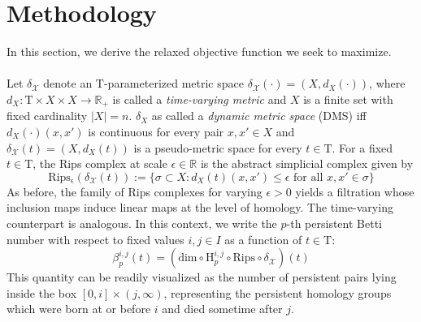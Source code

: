\documentclass[10pt]{article}
\begin{document}
\section{Methodology}
In this section, we derive the relaxed objective function we seek to maximize. 
\\
\\
Let $\delta_\mathcal{X}$ denote an $\mathrm{T}$-parameterized metric space $\delta_\mathcal{X}(\cdot) = ( X, d_X(\cdot) )$, where $d_X: \mathrm{T} \times X \times X \to \mathbb{R}_+$ is called a \emph{time-varying metric}  and $X$ is a finite set with fixed cardinality $\lvert X \rvert = n$. $\delta_X$ as called a \emph{dynamic metric space} (DMS) iff $d_X(\cdot)(x, x')$ is continuous for every pair $x, x' \in X$ and $\delta_\mathcal{X}(t) = (X, d_X(t))$ is a pseudo-metric space for every $t \in \mathrm{T}$. 
For a fixed $t \in \mathrm{T}$, the Rips complex at scale $\epsilon \in \mathbb{R}$ is the abstract simplicial complex given by 
\begin{equation}
	\mathrm{Rips_{\epsilon}}(\delta_\mathcal{X}(t)) := \{ \sigma \subset X : d_X(t)(x, x') \leq \epsilon \text{ for all } x, x' \in \sigma \}
\end{equation}
\noindent As before, the family of Rips complexes for varying $\epsilon > 0$ yields a filtration whose inclusion maps induce linear maps at the level of homology. The time-varying counterpart is analogous.  
In this context, we write the $p$-th persistent Betti number with respect to fixed values $i,j \in I$ as a function of $t \in \mathrm{T}$: 
\begin{equation}
\beta_{p}^{i,j}(t) = \left(\mathrm{dim} \circ \mathrm{H}_p^{i,j} \circ \mathrm{Rips} \circ \delta_\mathcal{X} \right)(t)
\end{equation}
This quantity can be readily visualized as the number of persistent pairs lying inside the box $[0, i] \times (j, \infty)$, representing the persistent homology groups which were born at or before $i$ and died sometime after $j$. 
\end{document}

